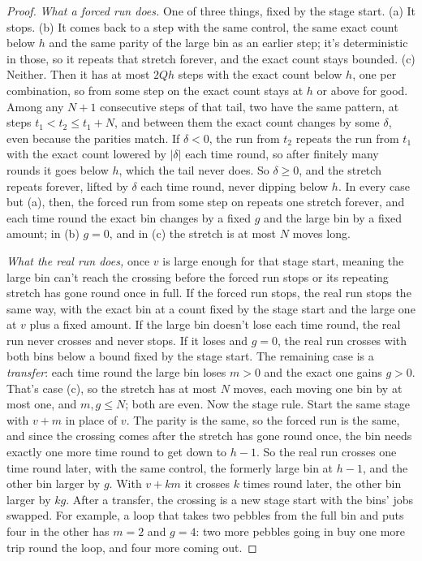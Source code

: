 \documentclass[11pt,twoside]{article}
\theoremstyle{thielethm}
\theoremstyle{thieledef}
\theoremstyle{thieledef}
\theoremstyle{thieledef}
\theoremstyle{thielethm}
\theoremstyle{thieleobs}
\theoremstyle{thielethm}
\begin{document}
\begin{proof}
\emph{What a forced run does.} One of three things, fixed by the stage start. (a) It stops. (b)
It comes back to a step with the same control, the same exact count below $h$ and the same
parity of the large bin as an earlier step; it's deterministic in those, so it repeats that
stretch forever, and the exact count stays bounded. (c) Neither. Then it has at most $2Qh$ steps
with the exact count below $h$, one per combination, so from some step on the exact count stays
at $h$ or above for good. Among any $N + 1$ consecutive steps of that tail, two have the same
pattern, at steps $t_1 < t_2 \le t_1 + N$, and between them the exact count changes by some
$\delta$, even because the parities match. If $\delta < 0$, the run from $t_2$ repeats the run
from $t_1$ with the exact count lowered by $|\delta|$ each time round, so after finitely many
rounds it goes below $h$, which the tail never does. So $\delta \ge 0$, and the stretch repeats
forever, lifted by $\delta$ each time round, never dipping below $h$. In every case but (a),
then, the forced run from some step on repeats one stretch forever, and each time round the exact
bin changes by a fixed $g$ and the large bin by a fixed amount; in (b) $g = 0$, and in (c) the
stretch is at most $N$ moves long.

\emph{What the real run does,} once $v$ is large enough for that stage start, meaning the large
bin can't reach the crossing before the forced run stops or its repeating stretch has gone round once in full. If the
forced run stops, the real run stops the same way, with the exact bin at a count fixed by the
stage start and the large one at $v$ plus a fixed amount. If the large bin doesn't lose each time
round, the real run never crosses and never stops. If it loses and $g = 0$, the real run crosses
with both bins below a bound fixed by the stage start. The remaining case is a \emph{transfer}:
each time round the large bin loses $m > 0$ and the exact one gains $g > 0$. That's case (c), so
the stretch has at most $N$ moves, each moving one bin by at most one, and $m, g \le N$; both are
even. Now the stage rule. Start the same stage with $v + m$ in place of $v$. The parity is the
same, so the forced run is the same, and since the crossing comes after the stretch has gone
round once, the bin needs exactly one more time round to get down to $h - 1$. So the real run
crosses one time round later, with the same control, the formerly large bin at $h - 1$, and the
other bin larger by $g$. With $v + km$ it crosses $k$ times round later, the other bin larger by
$kg$. After a transfer, the crossing is a new stage start with the bins' jobs swapped. For
example, a loop that takes two pebbles from the full bin and puts four in the other has $m = 2$
and $g = 4$: two more pebbles going in buy one more trip round the loop, and four more coming
out.


\end{proof}
\end{document}
